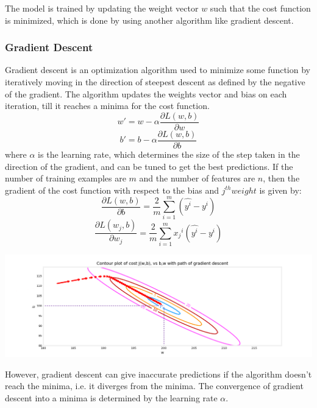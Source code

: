 \documentclass[12pt]{article}
\begin{document}
The model is trained by updating the weight vector $w$ such that the cost function is minimized, which is done by using another algorithm like gradient descent. 

\subsubsection*{Gradient Descent}
Gradient descent is an optimization algorithm used to minimize some function by iteratively moving in the direction of steepest descent as defined by the negative of the gradient. The algorithm updates the weights vector and bias on each iteration, till it reaches a minima for the cost function.
\begin{equation}
    w' = w - \alpha \frac{\partial L(w,b)}{\partial w}
\end{equation}
\begin{equation}
    b' = b - \alpha \frac{\partial L(w,b)}{\partial b}
\end{equation}
where $\alpha$ is the learning rate, which determines the size of the step taken in the direction of the gradient, and can be tuned to get the best predictions. 
If the number of training examples are $m$ and the number of features are $n$, then the gradient of the cost function with respect to the bias and $j^{th} weight$ is given by:
\begin{equation}
    \frac{\partial L(w,b)}{\partial b} = \frac{2}{m} \sum_{i=1}^{m} (\hat{y^i}-y^i)
\end{equation}
\begin{equation}
    \frac{\partial L(w_j,b)}{\partial w_j} = \frac{2}{m} \sum_{i=1}^{m} {x_j}^i(\hat{y^i}-y^i)
\end{equation}
\begin{center}
    \includegraphics*[width=\textwidth]{grad-descent.png}
\end{center}
However, gradient descent can give inaccurate predictions if the algorithm doesn't reach the minima, i.e. it diverges from the minima. The convergence of gradient descent into a minima is determined by the learning rate $\alpha$.
\end{document}
